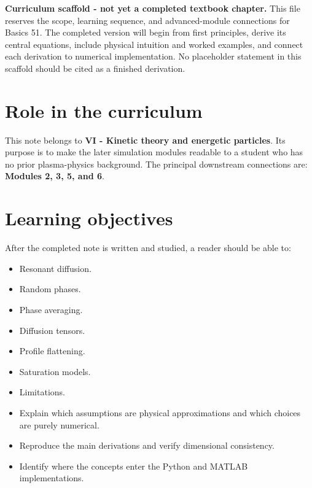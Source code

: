 \documentclass[11pt]{article}
\begin{document}

\begin{overviewbox}
\textbf{Curriculum scaffold - not yet a completed textbook chapter.} This file reserves the scope, learning sequence, and advanced-module connections for Basics 51. The completed version will begin from first principles, derive its central equations, include physical intuition and worked examples, and connect each derivation to numerical implementation. No placeholder statement in this scaffold should be cited as a finished derivation.
\end{overviewbox}

\ProjectTOC

\section{Role in the curriculum}
This note belongs to \textbf{VI - Kinetic theory and energetic particles}. Its purpose is to make the later simulation modules readable to a student who has no prior plasma-physics background. The principal downstream connections are: \textbf{Modules 2, 3, 5, and 6}.

\section{Learning objectives}
After the completed note is written and studied, a reader should be able to:
\begin{itemize}[leftmargin=1.6em]
\item Resonant diffusion.
\item Random phases.
\item Phase averaging.
\item Diffusion tensors.
\item Profile flattening.
\item Saturation models.
\item Limitations.
\item Explain which assumptions are physical approximations and which choices are purely numerical.
\item Reproduce the main derivations and verify dimensional consistency.
\item Identify where the concepts enter the Python and MATLAB implementations.
\end{itemize}
\end{document}
